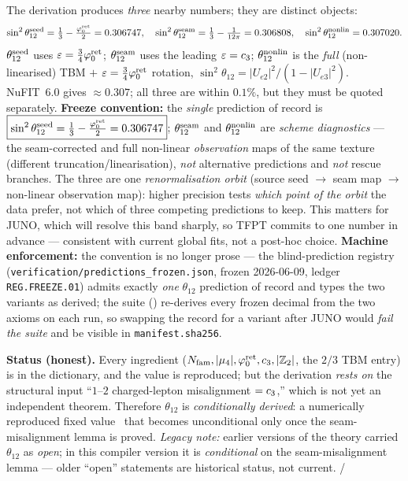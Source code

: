 \begin{keybox}
The derivation produces \emph{three} nearby numbers; they are distinct objects:
\[
  \sin^2\theta_{12}^{\rm seed}=\tfrac13-\tfrac{\varphi_0^{\mathrm{ret}}}{2}=0.306747,\quad
  \sin^2\theta_{12}^{\rm seam}=\tfrac13-\tfrac1{12\pi}=0.306808,\quad
  \sin^2\theta_{12}^{\rm nonlin}=0.307020 .
\]
$\theta_{12}^{\rm seed}$ uses $\varepsilon=\tfrac34\varphi_0^{\mathrm{ret}}$; $\theta_{12}^{\rm seam}$ uses the leading
$\varepsilon=c_3$; $\theta_{12}^{\rm nonlin}$ is the \emph{full} (non-linearised) TBM $+$
$\varepsilon=\tfrac34\varphi_0^{\mathrm{ret}}$ rotation, $\sin^2\theta_{12}=|U_{e2}|^2/(1-|U_{e3}|^2)$. NuFIT~6.0 gives
$\approx0.307$; all three are within $0.1\%$, but they must be quoted separately.
\textbf{Freeze convention:} the \emph{single} prediction of record is
$\boxed{\sin^2\theta_{12}^{\rm seed}=\tfrac13-\tfrac{\varphi_0^{\mathrm{ret}}}{2}=0.306747}$; $\theta_{12}^{\rm seam}$ and
$\theta_{12}^{\rm nonlin}$ are \emph{scheme diagnostics} --- the seam-corrected and full non-linear
\emph{observation} maps of the same texture (different truncation/linearisation), \emph{not} alternative
predictions and \emph{not} rescue branches. The three are one \emph{renormalisation orbit} (source seed
$\to$ seam map $\to$ non-linear observation map): higher precision tests \emph{which point of the orbit}
the data prefer, not which of three competing predictions to keep. This matters for JUNO, which will
resolve this band sharply, so TFPT commits to one number in advance --- consistent with current global
fits, not a post-hoc choice.
\textbf{Machine enforcement:} the convention is no longer prose --- the blind-prediction registry
(\texttt{verification/predictions\_frozen.json}, frozen 2026-06-09, ledger \texttt{REG.FREEZE.01}) admits
exactly \emph{one} $\theta_{12}$ prediction of record and types the two variants as derived; the suite
() re-derives every frozen decimal from the two axioms on each run, so
swapping the record for a variant after JUNO would \emph{fail the suite} and be visible in
\texttt{manifest.sha256}.
\end{keybox}

\noindent\textbf{Status (honest).} Every ingredient ($N_{\mathrm{fam}},|\mu_4|,\varphi_0^{\mathrm{ret}},c_3,|\mathbb{Z}_2|$, the $2/3$ TBM
entry) is in the dictionary, and the value is reproduced; but the derivation \emph{rests on} the structural
input ``$1$--$2$ charged-lepton misalignment $=c_3$,'' which is not yet an independent theorem.
Therefore $\theta_{12}$ is \emph{conditionally derived}: a numerically reproduced fixed value \mE\ that
becomes unconditional only once the seam-misalignment lemma is proved. \emph{Legacy note:} earlier
versions of the theory carried $\theta_{12}$ as \emph{open}; in this compiler version it is \emph{conditional}
on the seam-misalignment lemma --- older ``open'' statements are historical status, not current. \mE/\mC

